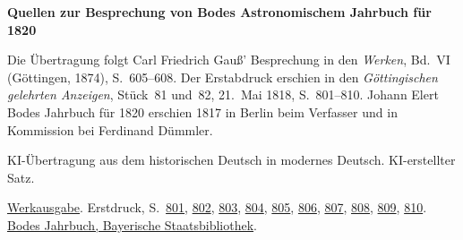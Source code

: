 \clearpage\thispagestyle{empty}
\begin{center}\Large\bfseries Quellen zur Besprechung von Bodes Astronomischem Jahrbuch für 1820\end{center}

Die Übertragung folgt Carl Friedrich Gauß’ Besprechung in den \emph{Werken}, Bd.~VI (Göttingen, 1874), S.~605--608. Der Erstabdruck erschien in den \emph{Göttingischen gelehrten Anzeigen}, Stück~81 und~82, 21.~Mai 1818, S.~801--810. Johann Elert Bodes Jahrbuch für 1820 erschien 1817 in Berlin beim Verfasser und in Kommission bei Ferdinand Dümmler.

KI-Übertragung aus dem historischen Deutsch in modernes Deutsch. KI-erstellter Satz.

\href{https://gdz.sub.uni-goettingen.de/id/PPN236007467}{Werkausgabe}. Erstdruck, S.~\href{https://images.p.sub.uni-goettingen.de/iiif/image/gdz:PPN319721507_1818:00000809/full/1650,/0/default.jpg}{801}, \href{https://images.p.sub.uni-goettingen.de/iiif/image/gdz:PPN319721507_1818:00000810/full/1650,/0/default.jpg}{802}, \href{https://images.p.sub.uni-goettingen.de/iiif/image/gdz:PPN319721507_1818:00000811/full/1650,/0/default.jpg}{803}, \href{https://images.p.sub.uni-goettingen.de/iiif/image/gdz:PPN319721507_1818:00000812/full/1650,/0/default.jpg}{804}, \href{https://images.p.sub.uni-goettingen.de/iiif/image/gdz:PPN319721507_1818:00000813/full/1650,/0/default.jpg}{805}, \href{https://images.p.sub.uni-goettingen.de/iiif/image/gdz:PPN319721507_1818:00000814/full/1650,/0/default.jpg}{806}, \href{https://images.p.sub.uni-goettingen.de/iiif/image/gdz:PPN319721507_1818:00000815/full/1650,/0/default.jpg}{807}, \href{https://images.p.sub.uni-goettingen.de/iiif/image/gdz:PPN319721507_1818:00000816/full/1650,/0/default.jpg}{808}, \href{https://images.p.sub.uni-goettingen.de/iiif/image/gdz:PPN319721507_1818:00000817/full/1650,/0/default.jpg}{809}, \href{https://images.p.sub.uni-goettingen.de/iiif/image/gdz:PPN319721507_1818:00000818/full/1650,/0/default.jpg}{810}. \href{https://www.digitale-sammlungen.de/view/bsb10538349?page=1}{Bodes Jahrbuch, Bayerische Staatsbibliothek}.

\clearpage
